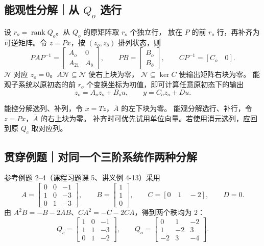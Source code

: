 \documentclass[UTF8,a4paper,12pt,fontset=fandol]{ctexart}
\DeclareMathOperator{\rank}{rank}
\begin{document}
\subsection*{能观性分解｜从 $Q_o$ 选行}
设 $r_o=\rank Q_o$。从 $Q_o$ 的原矩阵取 $r_o$ 个独立行，
放在 $P$ 的前 $r_o$ 行，再补齐为可逆矩阵。令
$z=Px$，按 $(z_o,z_{\bar o})$ 排列状态，则
\[
   PAP^{-1}=\begin{bmatrix}A_o&0\\A_{21}&A_{\bar o}\end{bmatrix},
   \qquad PB=\begin{bmatrix}B_o\\B_{\bar o}\end{bmatrix},
   \qquad CP^{-1}=[C_o\quad0].
\]
$\mathcal N$ 对应 $z_o=0$。$A\mathcal N\subseteq\mathcal N$ 使右上块为零，
$\mathcal N\subseteq\ker C$ 使输出矩阵右块为零。
能观子系统以原初态的前 $r_o$ 个变换坐标为初值，即可计算任意原初态下的输出
\[
  \dot z_o=A_o z_o+B_ou,\qquad y=C_oz_o+Du .
\]

\begin{keybox}
能控分解选列、补列，令 $x=Tz$，$\bar A$ 的左下块为零。
能观分解选行、补行，令 $z=Px$，$\bar A$ 的右上块为零。
补齐时可优先试用单位向量。若使用消元选列，应回到原 $Q_c$ 取对应列。
\end{keybox}

\newpage
\subsection*{贯穿例题｜对同一个三阶系统作两种分解}
参考例题 2--4（课程习题课 5、讲义例 4-13）采用
\[
 A=\begin{bmatrix}0&0&-1\\1&0&-3\\0&1&-3\end{bmatrix},\qquad
 B=\begin{bmatrix}1\\1\\0\end{bmatrix},\qquad C=[0\quad1\quad-2],\qquad D=0 .
\]
由 $A^2B=-B-2AB$、$CA^2=-C-2CA$，得到两个秩均为 $2$：
\[
 Q_c=\begin{bmatrix}1&0&-1\\1&1&-3\\0&1&-2\end{bmatrix},
 \qquad Q_o=\begin{bmatrix}0&1&-2\\1&-2&3\\-2&3&-4\end{bmatrix}.
\]
\end{document}
